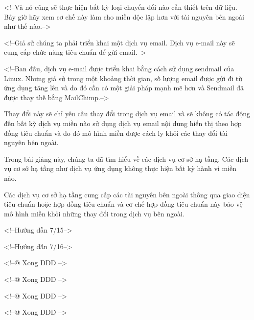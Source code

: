 <!--Và nó cũng sẽ thực hiện bất kỳ loại chuyển đổi nào cần thiết trên dữ liệu. Bây giờ hãy xem cơ chế này làm cho miền độc lập hơn với tài nguyên bên ngoài như thế nào.-->

<!--Giả sử chúng ta phải triển khai một dịch vụ email. Dịch vụ e-mail này sẽ cung cấp chức năng tiêu chuẩn để gửi email.-->

<!--Ban đầu, dịch vụ e-mail được triển khai bằng cách sử dụng sendmail của Linux. Nhưng giả sử trong một khoảng thời gian, số lượng email được gửi đi từ ứng dụng tăng lên và do đó cần có một giải pháp mạnh mẽ hơn và Sendmail đã được thay thế bằng MailChimp.-->

Thay đổi này sẽ chỉ yêu cầu thay đổi trong dịch vụ email và sẽ không có tác động đến bất kỳ dịch vụ miền nào sử dụng dịch vụ email nội dung hiển thị theo hợp đồng tiêu chuẩn và do đó mô hình miền được cách ly khỏi các thay đổi tài nguyên bên ngoài.

Trong bài giảng này, chúng ta đã tìm hiểu về các dịch vụ cơ sở hạ tầng. Các dịch vụ cơ sở hạ tầng như dịch vụ ứng dụng không thực hiện bất kỳ hành vi miền nào.

Các dịch vụ cơ sở hạ tầng cung cấp các tài nguyên bên ngoài thông qua giao diện tiêu chuẩn hoặc hợp đồng tiêu chuẩn và cơ chế hợp đồng tiêu chuẩn này bảo vệ mô hình miền khỏi những thay đổi trong dịch vụ bên ngoài.

<!--Hướng dẫn 7/15-->

<!--Hướng dẫn 7/16-->

<!--@ Xong DDD -->

<!--@ Xong DDD -->

<!--@ Xong DDD -->

<!--@ Xong DDD -->
